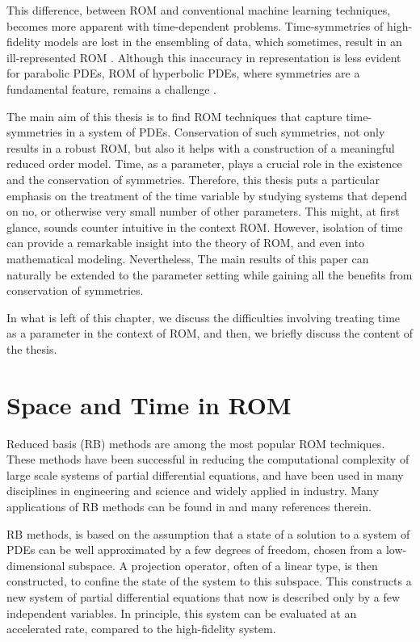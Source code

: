 This difference, between ROM and conventional machine learning techniques, becomes more apparent with time-dependent problems. Time-symmetries of high-fidelity models are lost in the ensembling of data, which sometimes, result in an ill-represented ROM \cite{doi:10.1137/1.9780898718713}. Although this inaccuracy in representation is less evident for parabolic PDEs, ROM of hyperbolic PDEs, where symmetries are a fundamental feature, remains a challenge \cite{doi:10.1137/17M1111991,kalashnikova2014stabilization,farhat2015structure,doi:10.1137/110836742,doi:10.1137/140959602,beattie2011structure,doi:10.1137/140978922}.

The main aim of this thesis is to find ROM techniques that capture time-symmetries in a system of PDEs. Conservation of such symmetries, not only results in a robust ROM, but also it helps with a construction of a meaningful reduced order model. Time, as a parameter, plays a crucial role in the existence and the conservation of symmetries. Therefore, this thesis puts a particular emphasis on the treatment of the time variable by studying systems that depend on no, or otherwise very small number of other parameters. This might, at first glance, sounds counter intuitive in the context ROM. However, isolation of time can provide a remarkable insight into the theory of ROM, and even into mathematical modeling. Nevertheless, The main results of this paper can naturally be extended to the parameter setting while gaining all the benefits from conservation of symmetries.

In what is left of this chapter, we discuss the difficulties involving treating time as a parameter in the context of ROM, and then, we briefly discuss the content of the thesis.

\section*{Space and Time in ROM}
Reduced basis (RB) methods are among the most popular ROM techniques. These methods have been successful in reducing the computational complexity of large scale systems of partial differential equations, and have been used in many disciplines in engineering and science and widely applied in industry. Many applications of RB methods can be found in \cite{hesthaven2015certified,quarteroni2015reduced,doi:10.1137/1.9781611974829,doi:10.1137/1.9780898718713} and many references therein.

RB methods, is based on the assumption that a state of a solution to a system of PDEs can be well approximated by a few degrees of freedom, chosen from a low-dimensional subspace. A projection operator, often of a linear type, is then constructed, to confine the state of the system to this subspace. This constructs a new system of partial differential equations that now is described only by a few independent variables. In principle, this system can be evaluated at an accelerated rate, compared to the high-fidelity system.

